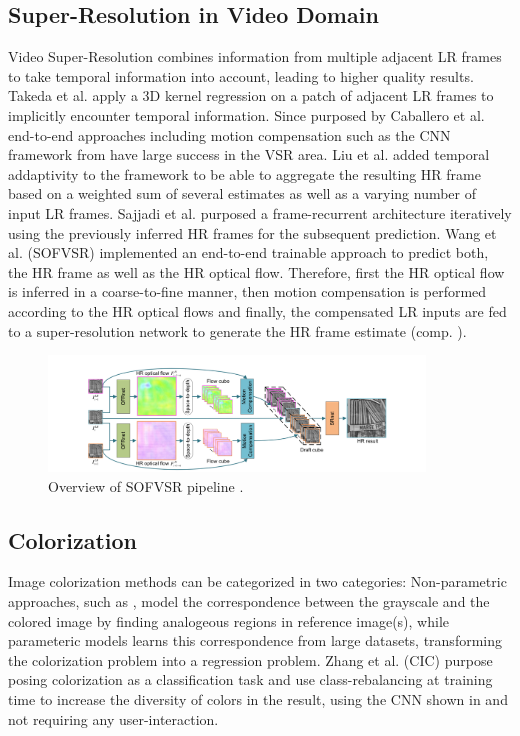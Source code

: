 \subsection{Super-Resolution in Video Domain}
Video Super-Resolution combines information from multiple adjacent LR frames
to take temporal information into account, leading to higher quality results.
Takeda et al. \cite{SRWESME} apply a 3D kernel regression on a patch of adjacent
LR frames to implicitly encounter temporal information. Since purposed by
Caballero et al. \cite{RTVSRWSTNAMC} end-to-end approaches including motion
compensation such as the CNN framework from \cite{RTVSRWSTNAMC} have large success
in the VSR area. Liu et al. \cite{RVSRWLTD} added temporal addaptivity to the
framework to be able to aggregate the resulting HR frame based on a weighted
sum of several estimates as well as a varying number of input LR frames. Sajjadi
et al. \cite{FRVSR} purposed a frame-recurrent architecture iteratively using
the previously inferred HR frames for the subsequent prediction. Wang et al.
\cite{LFVSRTHROFE} (SOFVSR) implemented an end-to-end trainable approach to predict
both, the HR frame as well as the HR optical flow. Therefore, first the HR
optical flow is inferred in a coarse-to-fine manner, then motion compensation is
performed according to the HR optical flows and finally, the compensated LR
inputs are fed to a super-resolution network to generate the HR frame estimate
(comp. ).

\begin{figure}[!htbp]
	\centering
	\includegraphics[width=10cm]{figures/sofvsr}
	\caption{Overview of SOFVSR pipeline \cite{LFVSRTHROFE}.}
  \label{fig:sofvsr}
\end{figure}

\subsection{Colorization}
Image colorization methods can be categorized in two categories: Non-parametric
approaches, such as \cite{ICUSI}, model the correspondence between the grayscale
and the colored image by finding analogeous regions in reference image(s),
while parameteric models learns this correspondence from large datasets,
transforming the colorization problem into a regression problem. Zhang et al.
\cite{CIC} (CIC) purpose posing colorization as a classification task and use
class-rebalancing at training time to increase the diversity of colors in the
result, using the CNN shown in  and not requiring any
user-interaction.

